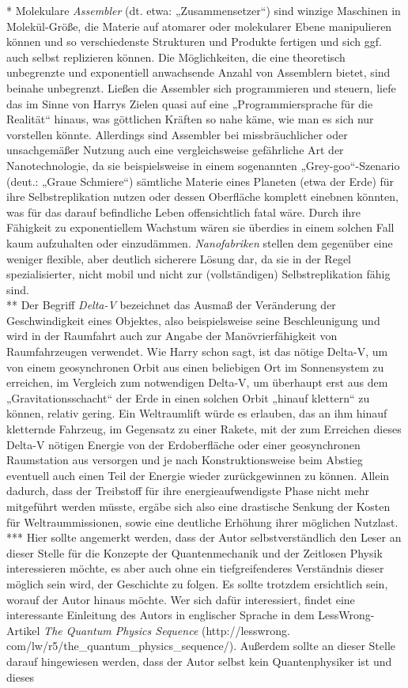 {* Molekulare \emph{Assembler} (dt. etwa: „Zusammensetzer“) sind winzige Maschinen in Molekül-Größe, die Materie auf atomarer oder molekularer Ebene manipulieren können und so verschiedenste Strukturen und Produkte fertigen und sich ggf. auch selbst replizieren können. Die Möglichkeiten, die eine theoretisch unbegrenzte und exponentiell anwachsende Anzahl von Assemblern bietet, sind beinahe unbegrenzt. Ließen die Assembler sich programmieren und steuern, liefe das im Sinne von Harrys Zielen quasi auf eine „Programmiersprache für die Realität“ hinaus, was göttlichen Kräften so nahe käme, wie man es sich nur vorstellen könnte. Allerdings sind Assembler bei missbräuchlicher oder unsachgemäßer Nutzung auch eine vergleichsweise gefährliche Art der Nanotechnologie, da sie beispielsweise in einem sogenannten „Grey-goo“-Szenario (deut.: „Graue Schmiere“) sämtliche Materie eines Planeten (etwa der Erde) für ihre Selbstreplikation nutzen oder dessen Oberfläche komplett einebnen könnten, was für das darauf befindliche Leben offensichtlich fatal wäre. Durch ihre Fähigkeit zu exponentiellem Wachstum wären sie überdies in einem solchen Fall kaum aufzuhalten oder einzudämmen. \emph{Nanofabriken} stellen dem gegenüber eine weniger flexible, aber deutlich sicherere Lösung dar, da sie in der Regel spezialisierter, nicht mobil und nicht zur (vollständigen) Selbstreplikation fähig sind.\\ ** Der Begriff \emph{Delta-V} bezeichnet das Ausmaß der Veränderung der Geschwindigkeit eines Objektes, also beispielsweise seine Beschleunigung und wird in der Raumfahrt auch zur Angabe der Manövrierfähigkeit von Raumfahrzeugen verwendet. Wie Harry schon sagt, ist das nötige Delta-V, um von einem geosynchronen Orbit aus einen beliebigen Ort im Sonnensystem zu erreichen, im Vergleich zum notwendigen Delta-V, um überhaupt erst aus dem „Gravitationsschacht“ der Erde in einen solchen Orbit „hinauf klettern“ zu können, relativ gering. Ein Weltraumlift würde es erlauben, das an ihm hinauf kletternde Fahrzeug, im Gegensatz zu einer Rakete, mit der zum Erreichen dieses Delta-V nötigen Energie von der Erdoberfläche oder einer geosynchronen Raumstation aus versorgen und je nach Konstruktionsweise beim Abstieg eventuell auch einen Teil der Energie wieder zurückgewinnen zu können. Allein dadurch, dass der Treibstoff für ihre energieaufwendigste Phase nicht mehr mitgeführt werden müsste, ergäbe sich also eine drastische Senkung der Kosten für Weltraummissionen, sowie eine deutliche Erhöhung ihrer möglichen Nutzlast.\\ *** Hier sollte angemerkt werden, dass der Autor selbstverständlich den Leser an dieser Stelle für die Konzepte der Quantenmechanik und der Zeitlosen Physik interessieren möchte, es aber auch ohne ein tiefgreifenderes Verständnis dieser möglich sein wird, der Geschichte zu folgen. Es sollte trotzdem ersichtlich sein, worauf der Autor hinaus möchte. Wer sich dafür interessiert, findet eine interessante Einleitung des Autors in englischer Sprache in dem LessWrong-Artikel \emph{The Quantum Physics Sequence} (http://lesswrong. com/lw/r5/the\_quantum\_physics\_sequence/). Außerdem sollte an dieser Stelle darauf hingewiesen werden, dass der Autor selbst kein Quantenphysiker ist und dieses }
